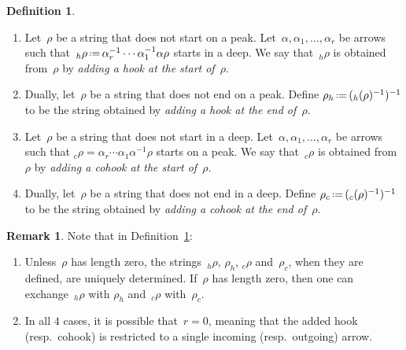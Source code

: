 \documentclass{amsart}
\theoremstyle{definition}
\newtheorem{definition}[theorem]{Definition}
\newtheorem{remark}[theorem]{Remark}
\newcommand{\eqdef}{\mbox{\,\raisebox{0.2ex}{\scriptsize\ensuremath{\mathrm:}}\ensuremath{=}\,}} %
\newcommand{\darkblue}{\color{darkblue}} %
\newcommand{\defn}[1]{\textsl{\darkblue #1}} %
\begin{document}
\begin{definition}
\label{def:addingRemovingHooksCohooks}
  \begin{enumerate}
    \item Let~$\rho$ be a string that does not start on a peak. Let~$\alpha, \alpha_1, \ldots, \alpha_r$ be arrows such that~$_h \rho \eqdef \alpha_r^{-1}\cdots \alpha_1^{-1} \alpha \rho$ starts in a deep.  We say that~$_h \rho$ is obtained from~$\rho$ by \defn{adding a hook at the start of~$\rho$}.

    \item Dually, let~$\rho$ be a string that does not end on a peak.  Define $\rho_h \eqdef (_h ( \rho )^{-1} )^{-1}$ to be the string obtained by \defn{adding a hook at the end of~$\rho$}.


    \item Let~$\rho$ be a string that does not start in a deep. Let~$\alpha, \alpha_1, \ldots, \alpha_r$ be arrows such that ${_c \rho =  \alpha_r \cdots \alpha_1 \alpha^{-1} \rho}$ starts on a peak. We say that~$_c \rho$ is obtained from~$\rho$ by \defn{adding a cohook at the start of~$\rho$}.

    \item Dually, let~$\rho$ be a string that does not end in a deep.  Define $\rho_c \eqdef (_c ( \rho )^{-1} )^{-1}$ to be the string obtained by \defn{adding a cohook at the end of~$\rho$}.

  \end{enumerate}
\end{definition}

\begin{remark}
Note that in Definition~\ref{def:addingRemovingHooksCohooks}:
  \begin{enumerate}
    \item Unless~$\rho$ has length zero, the strings~$_h\rho$, $\rho_h$, $_c\rho$ and~$\rho_c$, when they are defined, are uniquely determined. If~$\rho$ has length zero, then one can exchange~$_h\rho$ with $\rho_h$ and~$_c\rho$ with~$\rho_c$.
    \item In all $4$ cases, it is possible that~$r=0$, meaning that the added hook (resp.~cohook) is restricted to a single incoming (resp.~outgoing) arrow.
  \end{enumerate}    
\end{remark}
\end{document}
